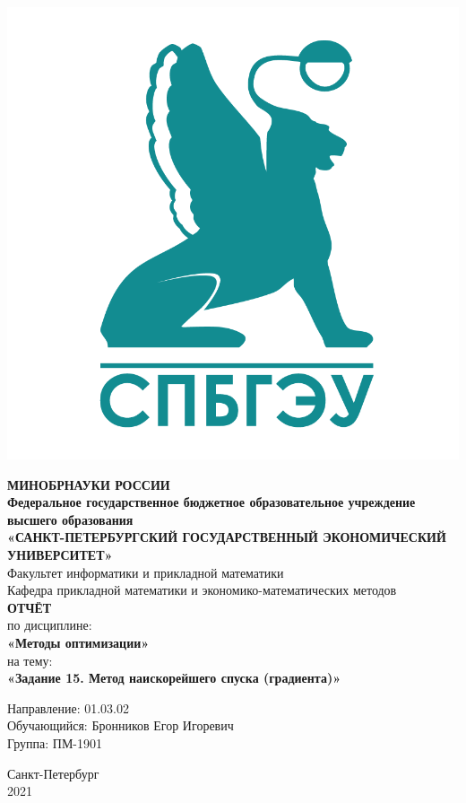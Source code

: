 \documentclass[14pt,a4paper,fleqn]{extarticle}
\begin{document}
	\begin{titlepage}
		\includegraphics[scale=0.12]{logo}
		\begin{center}
			\textbf{МИНОБРНАУКИ РОССИИ}\\
			\vspace{0.2cm}
			\textbf{Федеральное государственное бюджетное образовательное учреждение высшего образования}\\
			\textbf{«САНКТ-ПЕТЕРБУРГСКИЙ ГОСУДАРСТВЕННЫЙ ЭКОНОМИЧЕСКИЙ УНИВЕРСИТЕТ»}\\
			\vspace{0.6cm}
			Факультет информатики и прикладной математики\\
			Кафедра прикладной математики и экономико-математических методов\\
			\vspace{1cm}
			\textbf{ОТЧЁТ}\\
			по дисциплине:\\
			\textbf{«Методы оптимизации»}\\
			на тему:\\
			\textbf{«Задание 15. Метод наискорейшего спуска (градиента)»}\\
		\end{center}
		\vspace{1cm}
		Направление: 01.03.02\\
		Обучающийся: Бронников Егор Игоревич\\
		Группа: ПМ-1901\\
		\vfill
		\begin{center}
			Санкт-Петербург\\
			2021\\
		\end{center}
	\end{titlepage}
\end{document}
